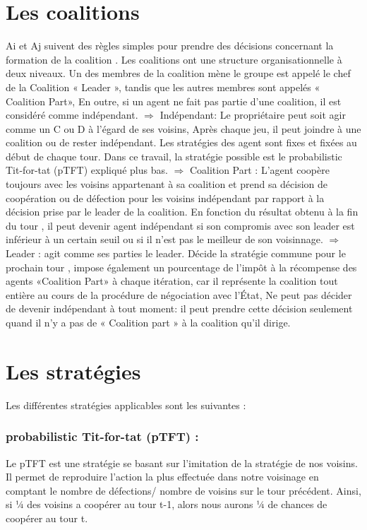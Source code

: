 \documentclass[30pt]{report}
\begin{document}
\part{Les coalitions}
Ai et Aj suivent des règles simples pour prendre des  décisions concernant la formation de la coalition . Les coalitions ont une structure organisationnelle à deux niveaux. Un des membres de la coalition mène le groupe  est appelé le chef de la Coalition « Leader »,  tandis que les autres membres sont appelés « Coalition Part», En outre, si un agent ne fait pas partie d'une coalition, il est considéré comme indépendant.
\newline
\newline
$\Rightarrow$
  Indépendant: Le propriétaire peut soit agir comme un C ou D  à l'égard de ses voisins, Après chaque jeu, il peut joindre à une coalition ou de rester indépendant.  Les stratégies des agent sont fixes et fixées au début de chaque tour. Dans ce travail, la stratégie possible est le probabilistic Tit-for-tat (pTFT) expliqué plus bas.
\newline
\newline
$\Rightarrow$
  Coalition Part :  L'agent coopère toujours avec les voisins appartenant à sa coalition et prend sa décision de coopération ou de défection pour les voisins indépendant par rapport à la décision prise par le leader de la coalition. En fonction du résultat obtenu à la fin du tour , il peut devenir agent indépendant si son compromis avec son leader est inférieur à un certain seuil ou si il n'est pas le meilleur de son voisinnage.
\newline
\newline
$\Rightarrow$
  Leader :  agit comme ses parties le leader. Décide la stratégie commune pour le prochain tour , impose également un pourcentage de l'impôt à la récompense des agents «Coalition Part» à chaque itération, car il représente la coalition tout entière au cours de la procédure de négociation avec l'État, Ne peut pas décider de devenir indépendant à tout moment: il peut prendre cette décision seulement quand il n'y a pas de « Coalition part » à la coalition qu'il dirige. 
  \newline
\part{Les stratégies}
Les différentes stratégies applicables sont les suivantes : 
\newline
\section{probabilistic Tit-for-tat (pTFT) :}
Le pTFT est une stratégie se basant sur l'imitation de la stratégie de nos voisins.
\newline
\newline
Il permet de reproduire l'action la plus effectuée dans notre voisinage en comptant le nombre de défections/ nombre de voisins sur le tour précédent.
\newline
\newline
Ainsi, si ¼ des voisins a coopérer au tour t-1, alors nous aurons  ¼  de chances de coopérer au tour t.
\newline
\end{document}
